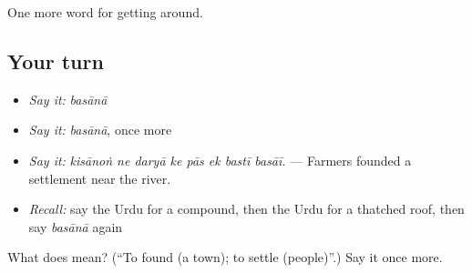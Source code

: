 \begin{grammarlens}[title={What you've built}]
One more word for getting around.
\end{grammarlens}

\subsection*{Your turn}
\begin{itemize}
\raggedright
  \item \emph{Say it:} \emph{basānā}
  \item \emph{Say it:} \emph{basānā}, once more
  \item \emph{Say it:} \emph{kisānoṅ ne daryā ke pās ek bastī basāī.} — Farmers founded a settlement near the river.
  \item \emph{Recall:} say the Urdu for a compound, then the Urdu for a thatched roof, then say \emph{basānā} again
\end{itemize}

\begin{tcolorbox}[breakable,colback=teal!4,colframe=teal!35!black,title={Before you move on}]
What does  mean? (\textquotedblleft{}To found (a town); to settle (people)\textquotedblright{}.) Say it once more.
\end{tcolorbox}
